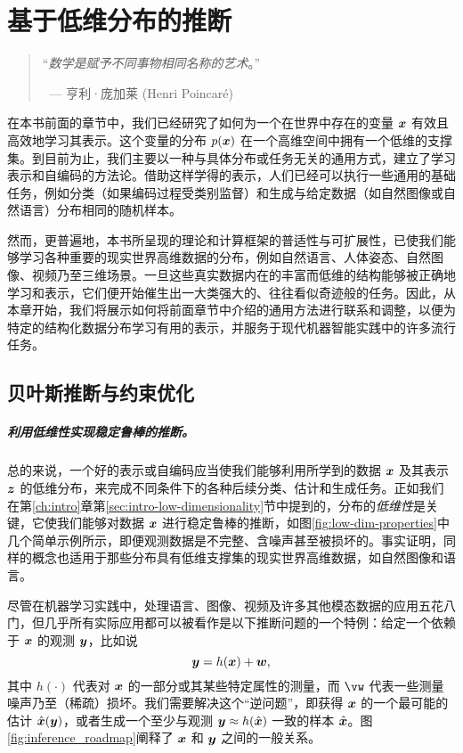 \documentclass[../../book-main.tex]{subfiles}
\begin{document}
\chapter{基于低维分布的推断}
\label{ch:conditional-inference}

\begin{quote}

\hfill    “{\em 数学是赋予不同事物相同名称的艺术}。”

$~$ \hfill --- 亨利·庞加莱 (Henri Poincar\'e)
\end{quote}
\vspace{5mm}


在本书前面的章节中，我们已经研究了如何为一个在世界中存在的变量 $\bm{x}$ 有效且高效地学习其表示。这个变量的分布 $p(\bm{x})$ 在一个高维空间中拥有一个低维的支撑集。到目前为止，我们主要以一种与具体分布或任务无关的通用方式，建立了学习表示和自编码的方法论。借助这样学得的表示，人们已经可以执行一些通用的基础任务，例如分类（如果编码过程受类别监督）和生成与给定数据（如自然图像或自然语言）分布相同的随机样本。

然而，更普遍地，本书所呈现的理论和计算框架的普适性与可扩展性，已使我们能够学习各种重要的现实世界高维数据的分布，例如自然语言、人体姿态、自然图像、视频乃至三维场景。一旦这些真实数据内在的丰富而低维的结构能够被正确地学习和表示，它们便开始催生出一大类强大的、往往看似奇迹般的任务。因此，从本章开始，我们将展示如何将前面章节中介绍的通用方法进行联系和调整，以便为特定的结构化数据分布学习有用的表示，并服务于现代机器智能实践中的许多流行任务。

\section{贝叶斯推断与约束优化}
\paragraph{利用低维性实现稳定鲁棒的推断。}
总的来说，一个好的表示或自编码应当使我们能够利用所学到的数据 $\bm{x}$ 及其表示 $\bm{z}$ 的低维分布，来完成不同条件下的各种后续分类、估计和生成任务。正如我们在第\ref{ch:intro}章第\ref{sec:intro-low-dimensionality}节中提到的，分布的{\em 低维性}是关键，它使我们能够对数据 $\bm{x}$ 进行稳定鲁棒的推断，如图\ref{fig:low-dim-properties}中几个简单示例所示，即便观测数据是不完整、含噪声甚至被损坏的。事实证明，同样的概念也适用于那些分布具有低维支撑集的现实世界高维数据，如自然图像和语言。

尽管在机器学习实践中，处理语言、图像、视频及许多其他模态数据的应用五花八门，但几乎所有实际应用都可以被看作是以下推断问题的一个特例：给定一个依赖于 $\bm{x}$ 的观测 $\bm{y}$，比如说
\begin{equation}
    \bm{y} = h(\bm{x}) + \boldsymbol{w},
\end{equation}
其中 $h(\cdot)$ 代表对 $\bm{x}$ 的一部分或其某些特定属性的测量，而 $\vw$ 代表一些测量噪声乃至（稀疏）损坏。我们需要解决这个“逆问题”，即获得 $\bm{x}$ 的一个最可能的估计 $\hat {\bm{x}}(\bm{y})$，或者生成一个至少与观测 $\bm{y} \approx h(\hat{\bm{x}})$ 一致的样本 $\hat{\bm{x}}$。图\ref{fig:inference_roadmap}阐释了 $\bm{x}$ 和 $\bm{y}$ 之间的一般关系。
\end{document}
